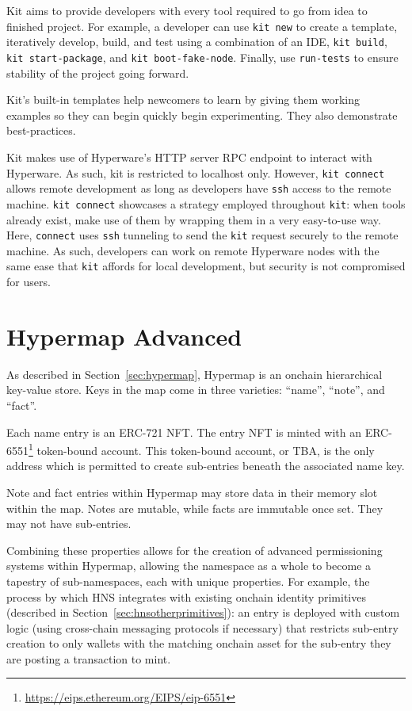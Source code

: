 \documentclass[runningheads]{llncs}
\begin{document}
Kit aims to provide developers with every tool required to go from idea to finished project.
For example, a developer can use \verb|kit new| to create a template, iteratively develop, build, and test using a combination of an IDE, \verb|kit build|, \verb|kit start-package|, and \verb|kit boot-fake-node|.
Finally, use \verb|run-tests| to ensure stability of the project going forward.

Kit's built-in templates help newcomers to learn by giving them working examples so they can begin quickly begin experimenting.
They also demonstrate best-practices.

Kit makes use of Hyperware's HTTP server RPC endpoint to interact with Hyperware.
As such, kit is restricted to localhost only.
However, \verb|kit connect| allows remote development as long as developers have \verb|ssh| access to the remote machine.
\verb|kit connect| showcases a strategy employed throughout \verb|kit|: when tools already exist, make use of them by wrapping them in a very easy-to-use way.
Here, \verb|connect| uses \verb|ssh| tunneling to send the \verb|kit| request securely to the remote machine.
As such, developers can work on remote Hyperware nodes with the same ease that \verb|kit| affords for local development, but security is not compromised for users.

\section{Hypermap Advanced}
\label{sec:hypermapadvanced}

As described in Section~\ref{sec:hypermap}, Hypermap is an onchain hierarchical key-value store.
Keys in the map come in three varieties: ``name'', ``note'', and ``fact''.

Each name entry is an ERC-721 NFT.
The entry NFT is minted with an ERC-6551\footnote{\url{https://eips.ethereum.org/EIPS/eip-6551}} token-bound account.
This token-bound account, or TBA, is the only address which is permitted to create sub-entries beneath the associated name key.

Note and fact entries within Hypermap may store data in their memory slot within the map.
Notes are mutable, while facts are immutable once set.
They may not have sub-entries.

Combining these properties allows for the creation of advanced permissioning systems within Hypermap, allowing the namespace as a whole to become a tapestry of sub-namespaces, each with unique properties.
For example, the process by which HNS integrates with existing onchain identity primitives (described in Section~\ref{sec:hnsotherprimitives}): an entry is deployed with custom logic (using cross-chain messaging protocols if necessary) that restricts sub-entry creation to only wallets with the matching onchain asset for the sub-entry they are posting a transaction to mint.
\end{document}
